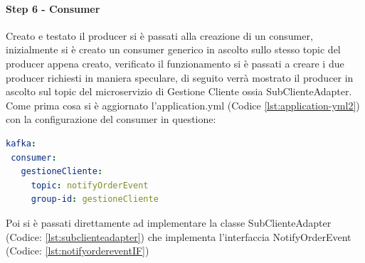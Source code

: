 \paragraph{Step 6 - Consumer}
Creato e testato il producer si è passati alla creazione di un consumer, inizialmente si è creato un consumer generico in ascolto sullo stesso topic del producer appena creato, verificato il funzionamento si è passati a creare i due producer richiesti in maniera speculare, di seguito verrà mostrato il producer in ascolto sul topic del microservizio di Gestione Cliente ossia SubClienteAdapter.
Come prima cosa si è aggiornato l’application.yml (Codice \vref{lst:application-yml2}) con la configurazione del consumer in questione:
\begin{lstlisting}[language=yaml, caption={Aggiornamento del file `application.yml` per il consumer Kafka}, label=lst:application-yml2]
kafka:
 consumer:
   gestioneCliente:
     topic: notifyOrderEvent
     group-id: gestioneCliente
\end{lstlisting}
Poi si è passati direttamente ad implementare la classe SubClienteAdapter (Codice: \vref{lst:subclienteadapter})  che implementa l'interfaccia NotifyOrderEvent (Codice: \vref{lst:notifyordereventIF})  
